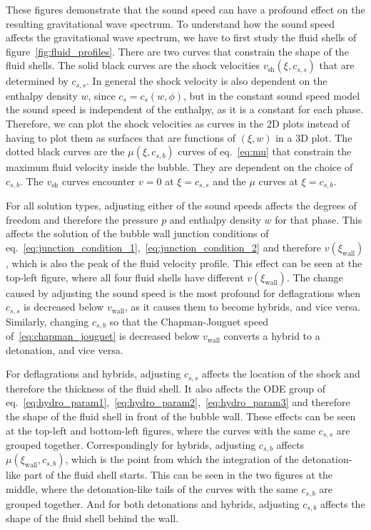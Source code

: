 These figures demonstrate that the sound speed can have a profound effect on the resulting gravitational wave spectrum.
To understand how the sound speed affects the gravitational wave spectrum,
we have to first study the fluid shells of figure~\ref{fig:fluid_profiles}.
There are two curves that constrain the shape of the fluid shells.
The solid black curves are the shock velocities $v_\text{sh}(\xi,c_{s,s})$ that are determined by $c_{s,s}$.
In general the shock velocity is also dependent on the enthalpy density $w$, since $c_s = c_s(w,\phi)$,
but in the constant sound speed model the sound speed is independent of the enthalpy,
as it is a constant for each phase.
Therefore, we can plot the shock velocities as curves in the 2D plots
instead of having to plot them as surfaces that are functions of $(\xi,w)$ in a 3D plot.
The dotted black curves are the $\mu(\xi,c_{s,b})$ curves of eq.~\eqref{eq:mu} that constrain the maximum fluid velocity inside the bubble.
They are dependent on the choice of $c_{s,b}$.
The $v_\text{sh}$ curves encounter $v=0$ at $\xi = c_{s,s}$ and the $\mu$ curves at $\xi = c_{s,b}$.

For all solution types, adjusting either of the sound speeds affects the degrees of freedom
and therefore the pressure $p$ and enthalpy density $w$ for that phase.
This affects the solution of the bubble wall junction conditions of eq.~\eqref{eq:junction_condition_1},~\eqref{eq:junction_condition_2} and therefore $v(\xi_\text{wall})$,
which is also the peak of the fluid velocity profile.
This effect can be seen at the top-left figure, where all four fluid shells have different $v(\xi_\text{wall})$.
The change caused by adjusting the sound speed is the most profound for deflagrations when $c_{s,s}$ is decreased below $v_\text{wall}$, as it causes them to become hybrids, and vice versa.
Similarly, changing $c_{s,b}$ so that the Chapman-Jouguet speed of~\eqref{eq:chapman_jouguet} is decreased below $v_\text{wall}$ converts a hybrid to a detonation, and vice versa.

For deflagrations and hybrids, adjusting $c_{s,s}$ affects the location of the shock and therefore the thickness of the fluid shell.
It also affects the ODE group of eq.~\eqref{eq:hydro_param1},~\eqref{eq:hydro_param2},~\eqref{eq:hydro_param3}
and therefore the shape of the fluid shell in front of the bubble wall.
These effects can be seen at the top-left and bottom-left figures, where the curves with the same $c_{s,s}$ are grouped together.
Correspondingly for hybrids, adjusting $c_{s,b}$ affects $\mu(\xi_\text{wall},c_{s,b})$,
which is the point from which the integration of the detonation-like part of the fluid shell starts.
This can be seen in the two figures at the middle, where the detonation-like tails of the curves with the same $c_{s,b}$ are grouped together.
And for both detonations and hybrids, adjusting $c_{s,b}$ affects the shape of the fluid shell behind the wall.

